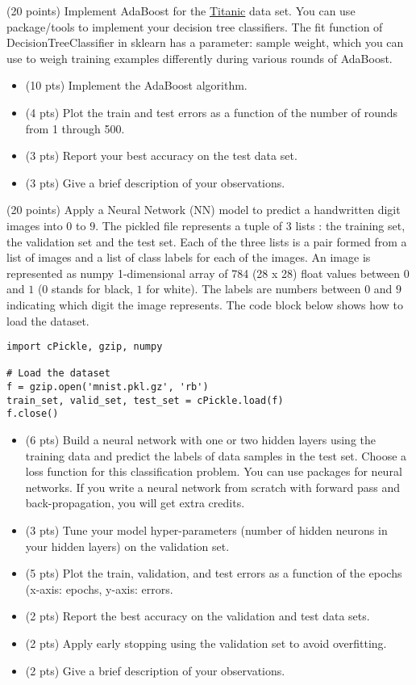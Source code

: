 \documentclass{exam}
\begin{document}
\begin{questions}
\newpage
{} (20 points) Implement AdaBoost for the \href{https://www.kaggle.com/c/titanic/data}{Titanic} data set. You can use package/tools to implement your decision tree classifiers. The fit function of DecisionTreeClassifier in sklearn has a parameter: sample weight, which you can use to weigh training examples differently during various
rounds of AdaBoost. 
\begin{itemize}
\item (10 pts) Implement the AdaBoost algorithm.
\item (4 pts) Plot the train and test errors as a function of the number of rounds from 1 through 500. 
\item (3 pts) Report your best accuracy on the test data set. 
\item (3 pts) Give a brief description of your observations.
\end{itemize}

 \newpage
  (20 points)  Apply a Neural Network (NN) model to predict a handwritten digit images into $0$ to $9$.  The pickled file represents a tuple of 3 lists : the training set, the validation set and the test set. Each of the three lists is a pair formed from a list of images and a list of class labels for each of the images. An image is represented as numpy 1-dimensional array of 784 (28 x 28) float values between $0$ and $1$ ($0$ stands for black, $1$ for white). The labels are numbers between $0$ and $9$ indicating which digit the image represents. The code block below shows how to load the dataset.
 
 \begin{lstlisting}
import cPickle, gzip, numpy

# Load the dataset
f = gzip.open('mnist.pkl.gz', 'rb')
train_set, valid_set, test_set = cPickle.load(f)
f.close()
\end{lstlisting}

\begin{itemize}
\item (6 pts) Build a neural network with one or two hidden layers using the training data and predict the labels of data samples in the test set. Choose a loss function for this classification problem. You can use packages for neural networks. If you write a neural network from scratch with forward pass and back-propagation, you will get extra credits.
\item (3 pts) Tune your model hyper-parameters (number of hidden neurons in your hidden layers) on the validation set.
\item (5 pts) Plot the train, validation, and test errors as a function of the epochs (x-axis: epochs, y-axis: errors. 
\item (2 pts) Report the best accuracy on the validation and test data sets.
\item (2 pts) Apply early stopping using the validation set to avoid overfitting.
\item (2 pts) Give a brief description of your observations.
\end{itemize}
\end{questions}
\end{document}
